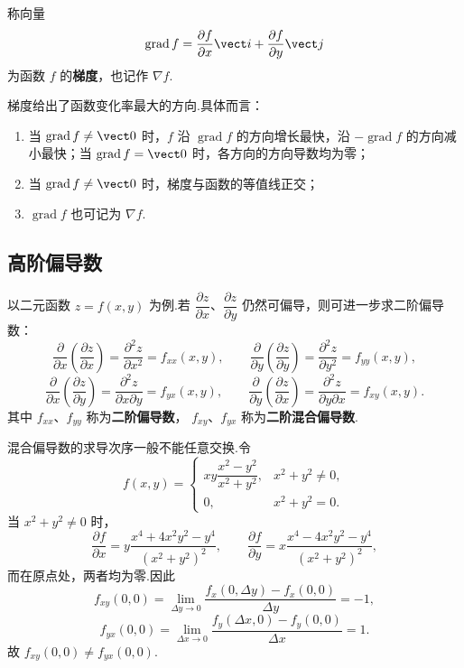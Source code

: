 \begin{definition}
	称向量
	\[
	\operatorname{grad}f
	=
	\frac{\partial f}{\partial x}\vect i
	+
	\frac{\partial f}{\partial y}\vect j
	\]
	为函数 $f$ 的\textbf{梯度}，也记作 $\nabla f$.
\end{definition}

梯度给出了函数变化率最大的方向.具体而言：
\begin{enumerate}
	\item 当 $\operatorname{grad}f\ne\vect 0$ 时，$f$ 沿
	$\operatorname{grad}f$ 的方向增长最快，沿
	$-\operatorname{grad}f$ 的方向减小最快；当
	$\operatorname{grad}f=\vect 0$ 时，各方向的方向导数均为零；
	\item 当 $\operatorname{grad}f\ne\vect 0$ 时，梯度与函数的等值线正交；
	\item $\operatorname{grad}f$ 也可记为 $\nabla f$.
\end{enumerate}

\subsection*{高阶偏导数}

以二元函数 $z=f(x,y)$ 为例.若
$\dfrac{\partial z}{\partial x}$、$\dfrac{\partial z}{\partial y}$
仍然可偏导，则可进一步求二阶偏导数：
\[
\frac{\partial}{\partial x}
\left(\frac{\partial z}{\partial x}\right)
=
\frac{\partial^2z}{\partial x^2}
=f_{xx}(x,y),
\qquad
\frac{\partial}{\partial y}
\left(\frac{\partial z}{\partial y}\right)
=
\frac{\partial^2z}{\partial y^2}
=f_{yy}(x,y),
\]
\[
\frac{\partial}{\partial x}
\left(\frac{\partial z}{\partial y}\right)
=
\frac{\partial^2z}{\partial x\partial y}
=f_{yx}(x,y),
\qquad
\frac{\partial}{\partial y}
\left(\frac{\partial z}{\partial x}\right)
=
\frac{\partial^2z}{\partial y\partial x}
=f_{xy}(x,y).
\]
其中 $f_{xx}$、$f_{yy}$ 称为\textbf{二阶偏导数}，
$f_{xy}$、$f_{yx}$ 称为\textbf{二阶混合偏导数}.

\begin{example}
	混合偏导数的求导次序一般不能任意交换.令
	\[
	f(x,y)=
	\begin{cases}
	xy\dfrac{x^2-y^2}{x^2+y^2},&x^2+y^2\ne0,\\[6pt]
	0,&x^2+y^2=0.
	\end{cases}
	\]
	当 $x^2+y^2\ne0$ 时，
	\[
	\frac{\partial f}{\partial x}
	=
	y\frac{x^4+4x^2y^2-y^4}{(x^2+y^2)^2},
	\qquad
	\frac{\partial f}{\partial y}
	=
	x\frac{x^4-4x^2y^2-y^4}{(x^2+y^2)^2},
	\]
	而在原点处，两者均为零.因此
	\[
	f_{xy}(0,0)
	=
	\lim_{\Delta y\to0}
	\frac{f_x(0,\Delta y)-f_x(0,0)}{\Delta y}
	=-1,
	\]
	\[
	f_{yx}(0,0)
	=
	\lim_{\Delta x\to0}
	\frac{f_y(\Delta x,0)-f_y(0,0)}{\Delta x}
	=1.
	\]
	故 $f_{xy}(0,0)\ne f_{yx}(0,0)$.
\end{example}

